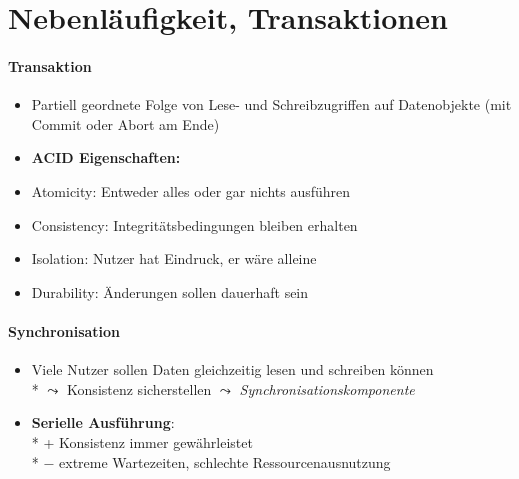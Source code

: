 \section{Nebenläufigkeit, Transaktionen}
\label{sec:parallel}

\paragraph{Transaktion}
\begin{itemize}
	\item Partiell geordnete Folge von Lese- und Schreibzugriffen auf Datenobjekte (mit Commit oder Abort am Ende)
	\item \textbf{ACID Eigenschaften:}
	\item Atomicity: Entweder alles oder gar nichts ausführen
	\item Consistency: Integritätsbedingungen bleiben erhalten
	\item Isolation: Nutzer hat Eindruck, er wäre alleine
	\item Durability: Änderungen sollen dauerhaft sein
\end{itemize}

\paragraph{Synchronisation}
\begin{itemize}
	\item Viele Nutzer sollen Daten gleichzeitig lesen und schreiben können
		\\*
		\( \leadsto \) Konsistenz sicherstellen \( \leadsto \) \emph{Synchronisationskomponente}
	\item \textbf{Serielle Ausführung}: 
		\\*
		+ Konsistenz immer gewährleistet 
		\\*
		$-$ extreme Wartezeiten, schlechte Ressourcenausnutzung
\end{itemize}

